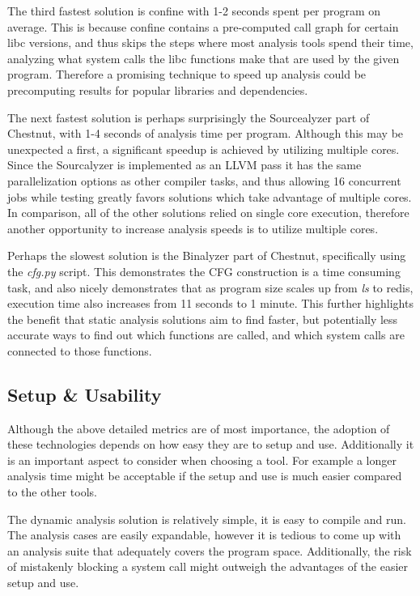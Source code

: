 The third fastest solution is confine with 1-2 seconds spent per program on average. This is because confine contains a pre-computed call graph for certain libc versions, and thus skips the steps where most analysis tools spend their time, analyzing what system calls the libc functions make that are used by the given program. Therefore a promising technique to speed up analysis could be precomputing results for popular libraries and dependencies.

The next fastest solution is perhaps surprisingly the Sourcealyzer part of Chestnut, with 1-4 seconds of analysis time per program. Although this may be unexpected a first, a significant speedup is achieved by utilizing multiple cores. Since the Sourcalyzer is implemented as an LLVM pass it has the same parallelization options as other compiler tasks, and thus allowing 16 concurrent jobs while testing greatly favors solutions which take advantage of multiple cores. In comparison, all of the other solutions relied on single core execution, therefore another opportunity to increase analysis speeds is to utilize multiple cores.

Perhaps the slowest solution is the Binalyzer part of Chestnut, specifically using the \textit{cfg.py} script.
This demonstrates the CFG construction is a time consuming task, and also nicely demonstrates that as program size scales up from \textit{ls} to redis, execution time also increases from 11 seconds to 1 minute. This further highlights the benefit that static analysis solutions aim to find faster, but potentially less accurate ways to find out which functions are called, and which system calls are connected to those functions.

\subsection {Setup \& Usability}
Although the above detailed metrics are of most importance, the adoption of these technologies depends on how easy they are to setup and use. Additionally it is an important aspect to consider when choosing a tool. For example a longer analysis time might be acceptable if the setup and use is much easier compared to the other tools.

The dynamic analysis solution is relatively simple, it is easy to compile and run. The analysis cases are easily expandable, however it is tedious to come up with an analysis suite that adequately covers the program space. Additionally, the risk of mistakenly blocking a system call might outweigh the advantages of the easier setup and use.

